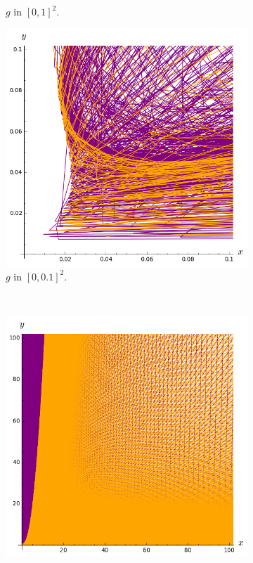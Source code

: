 \documentclass{beamer}
\begin{document}
\begin{frame}
\begin{figure}
\begin{subfigure}{.28\linewidth}
\vspace{-0.1cm}\caption{$g$ in $[0, 1]^2$.}
\end{subfigure} \hspace{0.4cm}
\begin{subfigure}{.28\linewidth}\centering
\includegraphics[width=1\textwidth]{plots/ch5_26_1curves4.png}
\vspace{-0.1cm}\caption{$g$ in $[0, 0.1]^2$.}
\end{subfigure}\\[1ex]
\vspace{0.1cm}
\begin{subfigure}{.28\linewidth}\centering
\includegraphics[width=1\textwidth]{plots/ch5_29_3curves3.png}

\end{subfigure}
\end{figure}
\end{frame}
\end{document}
